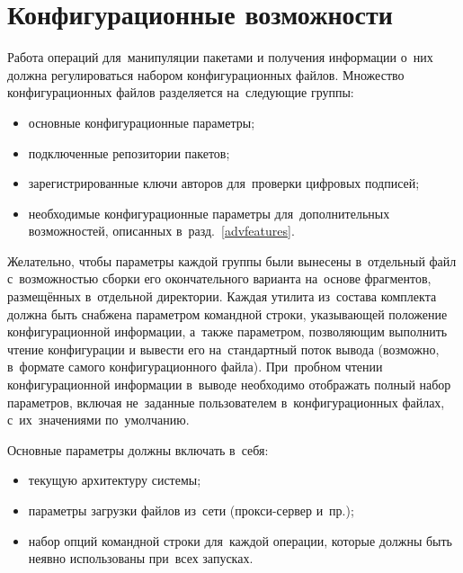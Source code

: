 \section{Конфигурационные возможности}

Работа операций для~манипуляции пакетами и получения информации о~них должна регулироваться набором конфигурационных файлов.
Множество конфигурационных файлов разделяется на~следующие группы:

\begin{itemize}
\item{основные конфигурационные параметры;}
\item {подключенные репозитории пакетов;}
\item {зарегистрированные ключи авторов для~проверки цифровых подписей;}
\item{необходимые конфигурационные параметры для~дополнительных возможностей, описанных в~разд.~\ref{advfeatures}.}
\end{itemize}

Желательно, чтобы параметры каждой группы были вынесены в~отдельный файл с~возможностью 
сборки его окончательного варианта на~основе фрагментов, размещённых в~отдельной директории.
Каждая утилита из~состава комплекта должна быть снабжена параметром командной строки,
указывающей положение конфигурационной информации,
а~также параметром, позволяющим выполнить чтение конфигурации и вывести его на~стандартный поток вывода (возможно, в~формате самого конфигурационного файла). 
При~пробном чтении конфигурационной информации в~выводе необходимо    отображать 
полный набор параметров, включая не~заданные пользователем в~конфигурационных файлах, с~их~значениями  по~умолчанию.

Основные параметры должны включать в~себя:

\begin{itemize}
\item {текущую архитектуру системы;}
\item {параметры загрузки файлов из~сети (прокси-сервер и~пр.);}
\item {набор опций командной строки для~каждой операции, которые должны быть неявно использованы при~всех запусках.}
\end{itemize}

